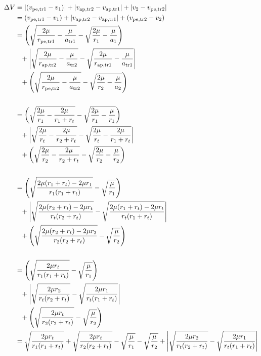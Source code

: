 \documentclass[../basicOrbitalDynamics.tex]{subfiles}
\begin{document}
\begin{align*}
    \Delta V &= |({v}_\text{pe,tr1}-v_1)|+|{v}_\text{ap,tr2}-{v}_\text{ap,tr1}|+|v_2-{v}_\text{pe,tr2}| \\
    &= ({v}_\text{pe,tr1}-v_1)+|{v}_\text{ap,tr2}-{v}_\text{ap,tr1}|+({v}_\text{pe,tr2}-v_2) \\
    &= \left(\sqrt{\frac{2\mu}{{r}_\text{pe,tr1}}-\frac{\mu}{{a}_\text{tr1}}}-\sqrt{\frac{2\mu}{r_1}-\frac{\mu}{a_1}}\right) \\
             & \phantom{=} +\left|\sqrt{\frac{2\mu}{{r}_\text{ap,tr2}}-\frac{\mu}{{a}_\text{tr2}}}-\sqrt{\frac{2\mu}{{r}_\text{ap,tr1}}-\frac{\mu}{{a}_\text{tr1}}}\right| \\
             & \phantom{=} +\left(\sqrt{\frac{2\mu}{{r}_\text{pe,tr2}}-\frac{\mu}{{a}_\text{tr2}}}-\sqrt{\frac{2\mu}{r_2}-\frac{\mu}{a_2}}\right) \\\\
    &= \left(\sqrt{\frac{2\mu}{r_1}-\frac{2\mu}{r_1+r_t}}-\sqrt{\frac{2\mu}{r_1}-\frac{\mu}{r_1}}\right) \\
             & \phantom{=} +\left|\sqrt{\frac{2\mu}{r_t}-\frac{2\mu}{r_2+r_t}}-\sqrt{\frac{2\mu}{r_t}-\frac{2\mu}{r_1+r_t}}\right| \\
             & \phantom{=} +\left(\sqrt{\frac{2\mu}{r_2}-\frac{2\mu}{r_2+r_t}}-\sqrt{\frac{2\mu}{r_2}-\frac{\mu}{r_2}}\right) \\\\
    &= \left(\sqrt{\frac{2\mu(r_1+r_t)-2\mu r_1}{r_1(r_1+r_t)}}-\sqrt{\frac{\mu}{r_1}}\right) \\
             & \phantom{=} +\left|\sqrt{\frac{2\mu(r_2+r_t)-2\mu r_t}{r_t(r_2+r_t)}}-\sqrt{\frac{2\mu(r_1+r_t)-2\mu r_t}{r_t(r_1+r_t)}}\right| \\
             & \phantom{=} +\left(\sqrt{\frac{2\mu(r_2+r_t)-2\mu r_2}{r_2(r_2+r_t)}}-\sqrt{\frac{\mu}{r_2}}\right) \\\\
    &= \left(\sqrt{\frac{2\mu r_t}{r_1(r_1+r_t)}}-\sqrt{\frac{\mu}{r_1}}\right) \\
             & \phantom{=} +\left|\sqrt{\frac{2\mu r_2}{r_t(r_2+r_t)}}-\sqrt{\frac{2\mu r_1}{r_t(r_1+r_t)}}\right| \\
             & \phantom{=} +\left(\sqrt{\frac{2\mu r_t}{r_2(r_2+r_t)}}-\sqrt{\frac{\mu}{r_2}}\right) \\
    &= \sqrt{\frac{2\mu r_t}{r_1(r_1+r_t)}}+\sqrt{\frac{2\mu r_t}{r_2(r_2+r_t)}}-\sqrt{\frac{\mu}{r_1}}-\sqrt{\frac{\mu}{r_2}}+\left|\sqrt{\frac{2\mu r_2}{r_t(r_2+r_t)}}-\sqrt{\frac{2\mu r_1}{r_t(r_1+r_t)}}\right|
\end{align*}
\end{document}
